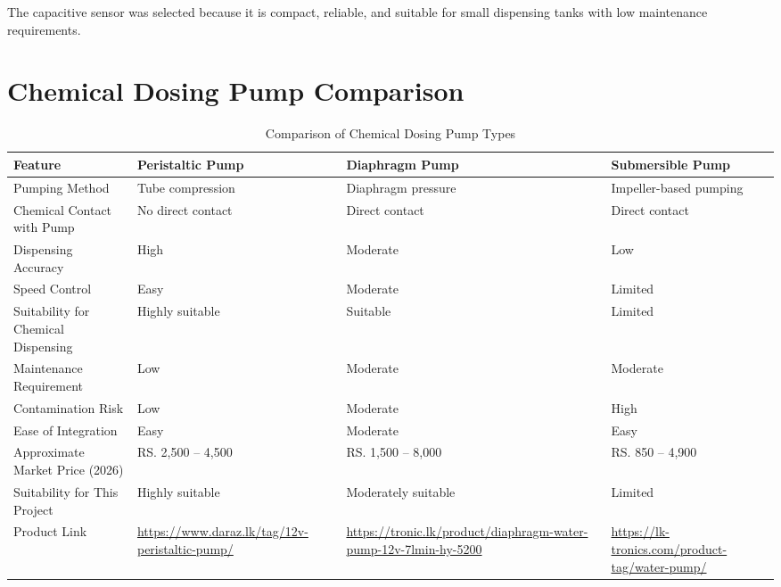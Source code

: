 \documentclass[12pt,a4paper]{report}
\begin{document}
The capacitive sensor was selected because it is compact, reliable, and suitable for small dispensing tanks with low maintenance requirements.

\section{Chemical Dosing Pump Comparison}

\begin{table}[H]
\centering
\small
\begin{tabularx}{\textwidth}{|p{3cm}|>{\raggedright\arraybackslash}X|>{\raggedright\arraybackslash}X|>{\raggedright\arraybackslash}X|}
\hline
\textbf{Feature} & \textbf{Peristaltic Pump} & \textbf{Diaphragm Pump} & \textbf{Submersible Pump} \\
\hline

Pumping Method &
Tube compression &
Diaphragm pressure &
Impeller-based pumping \\
\hline

Chemical Contact with Pump &
No direct contact &
Direct contact &
Direct contact \\
\hline

Dispensing Accuracy &
High &
Moderate &
Low \\
\hline

Speed Control &
Easy &
Moderate &
Limited \\
\hline

Suitability for Chemical Dispensing &
Highly suitable &
Suitable &
Limited \\
\hline

Maintenance Requirement &
Low &
Moderate &
Moderate \\
\hline

Contamination Risk &
Low &
Moderate &
High \\
\hline

Ease of Integration &
Easy &
Moderate &
Easy \\
\hline

Approximate Market Price (2026) &
RS. 2,500 -- 4,500 &
RS. 1,500 -- 8,000 &
RS. 850 -- 4,900 \\
\hline

Suitability for This Project &
Highly suitable &
Moderately suitable &
Limited \\
\hline

Product Link &
\url{https://www.daraz.lk/tag/12v-peristaltic-pump/} &
\url{https://tronic.lk/product/diaphragm-water-pump-12v-7lmin-hy-5200} &
\url{https://lk-tronics.com/product-tag/water-pump/} \\
\hline

\end{tabularx}
\caption{Comparison of Chemical Dosing Pump Types}
\end{table}
\end{document}
